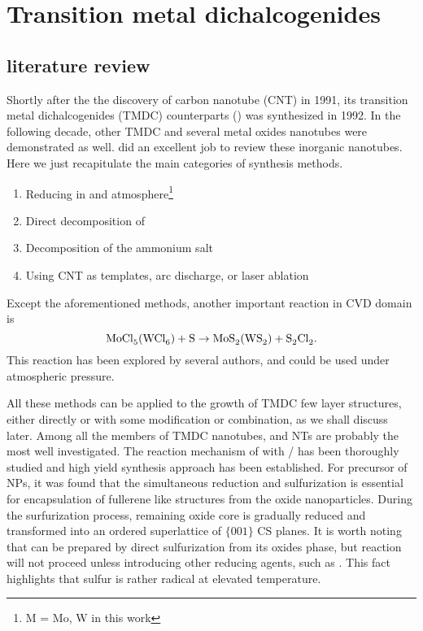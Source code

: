 
\chapter{Transition metal dichalcogenides}

\section{literature review}


Shortly after the the discovery of carbon nanotube (CNT) in 1991,\cite{Iijima1991} its transition metal dichalcogenides (TMDC) counterparts () was synthesized in 1992.\cite{Tenne1992} In the following decade, other TMDC and several metal oxides nanotubes were demonstrated as well. \citeauthor{Rao2003} did an excellent job to review these inorganic nanotubes.\cite{Rao2003} Here we just recapitulate the main categories of synthesis methods.
\begin{enumerate}
\item Reducing  in  and  atmosphere\footnote{M = Mo, W in this work}
\item Direct decomposition of 
\item Decomposition of the ammonium salt 
\item Using CNT as templates, arc discharge, or laser ablation
\end{enumerate}

Except the aforementioned methods, another important reaction in CVD domain is
\[
\cee{MoCl5(WCl6) + S \rightarrow MoS2(WS2) + S2Cl2}.
\]
This reaction has been explored by several authors,\cite{Stoffels1999} and could be used under atmospheric pressure.\cite{Li2004a}

All these methods can be applied to the growth of TMDC few layer structures, either directly or with some modification or combination, as we shall discuss later. Among all the members of TMDC nanotubes,  and  NTs are probably the most well investigated.\cite{Homyonfer1997,Tenne1998,Frey1998,Frey1999,Rothschild2000,Zak2000} The reaction mechanism of  with / has been thoroughly studied \cite{Feldman1998} and high yield synthesis approach has been established.\cite{Margolin2004} For precursor of  NPs, it was found that the simultaneous reduction and sulfurization is essential for encapsulation of fullerene like  structures from the oxide nanoparticles. During the surfurization process, remaining oxide core is gradually reduced and transformed into an ordered superlattice of $\{ 001 \}$ CS planes. It is worth noting that  can be prepared by direct sulfurization from its oxides phase, but reaction  will not proceed unless introducing other reducing agents, such as .\cite{Tsirlina1998} This fact highlights that sulfur is rather radical at elevated temperature.


